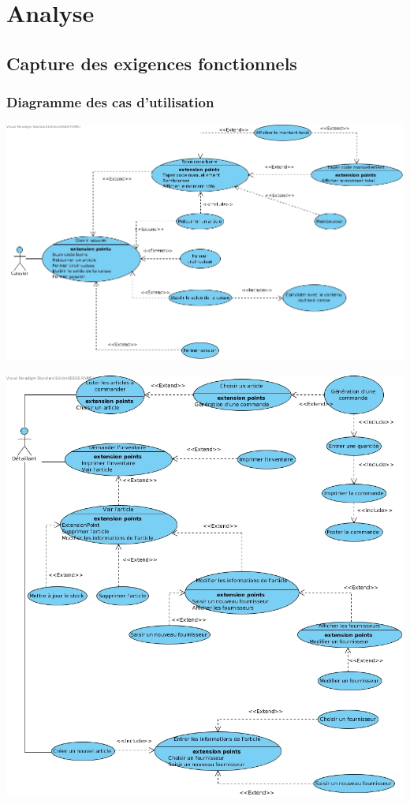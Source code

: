 \part{Analyse}

\chapter{Capture des exigences fonctionnels}

\section{Diagramme des cas d'utilisation}
\begin{center}
	\includegraphics[width=14cm]{Analyse/DiagrammeUseCaseCaisser.jpg}
\end{center}

\begin{center}
	\includegraphics[width=14cm]{Analyse/DiagrammeUseCaseDetaillant.jpg}
\end{center}

